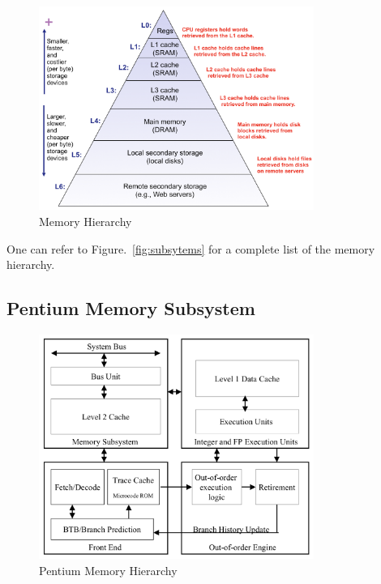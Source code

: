 \documentclass[doc,natbib,12pt]{apa6}
\begin{document}
	
	\begin{figure} [htpb]
		\centering
		\includegraphics[width=0.8\textwidth]{subsytems.png}
		\caption{\label{fig:subsytems}Memory Hierarchy \citep{Bryant2015}}
	\end{figure}    
	
	One can refer to Figure.~\vref{fig:subsytems} for a complete list of the memory hierarchy. 
	
	\subsection{Pentium Memory Subsystem}
	
	\begin{figure}
		\centering
		\includegraphics[width=0.8\textwidth]{pentiumMemory.png}
		\caption{\label{fig:pentiumMemory}Pentium Memory Hierarchy \citep{Hinton2001}}
	\end{figure}    
	
	
	
\end{document}
